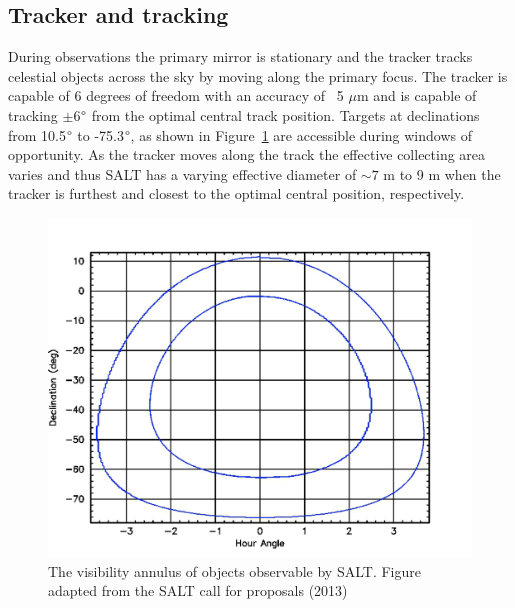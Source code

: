 \subsection{Tracker and tracking}

During observations the primary mirror is stationary and the tracker tracks celestial objects across the sky by moving along the primary focus. The tracker is capable of 6 degrees of freedom with an accuracy of ~5 $\mu$m and is capable of tracking $\pm$6$\degree$ from the optimal central track position. Targets at declinations from 10.5$\degree$ to -75.3$\degree$, as shown in Figure~\ref{fig:SALT_visibility} are accessible during windows of opportunity. As the tracker moves along the track the effective collecting area varies and thus SALT has a varying effective diameter of $\sim7$ m to 9 m when the tracker is furthest and closest to the optimal central position, respectively.
\prgph

\begin{figure}[t]
  \centering
  \includegraphics[width = 1.0 \textwidth]{figures/2_SALT_visibility.png}
  \caption{The visibility annulus of objects observable by SALT. Figure adapted from the SALT call for proposals (2013)\protect\footnotemark}
  \label{fig:SALT_visibility}
\end{figure}


